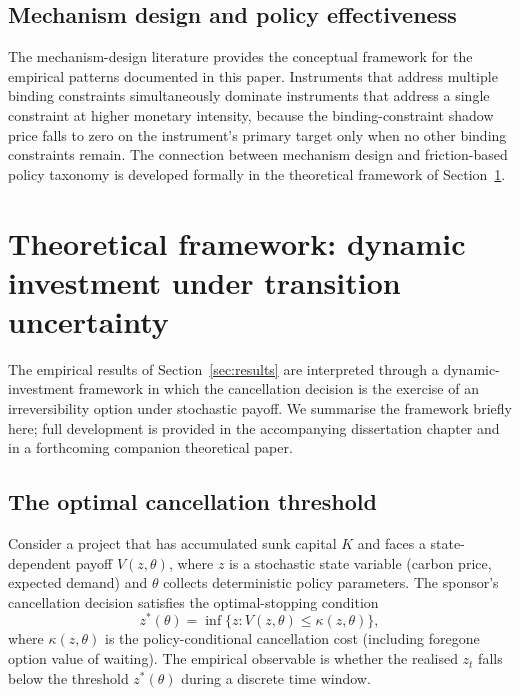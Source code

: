 \documentclass[12pt,a4paper]{article}
\theoremstyle{plain}
\theoremstyle{definition}
\begin{document}
\subsection{Mechanism design and policy effectiveness}
\label{sec:lit-mechanism}

The mechanism-design literature \cite{laffont2002theory, holmstrom1991multitask} provides the conceptual framework for the empirical patterns documented in this paper. Instruments that address multiple binding constraints simultaneously dominate instruments that address a single constraint at higher monetary intensity, because the binding-constraint shadow price falls to zero on the instrument's primary target only when no other binding constraints remain. The connection between mechanism design and friction-based policy taxonomy is developed formally in the theoretical framework of Section~\ref{sec:framework}.

\section{Theoretical framework: dynamic investment under transition uncertainty}
\label{sec:framework}

The empirical results of Section~\ref{sec:results} are interpreted through a dynamic-investment framework in which the cancellation decision is the exercise of an irreversibility option under stochastic payoff. We summarise the framework briefly here; full development is provided in the accompanying dissertation chapter and in a forthcoming companion theoretical paper.

\subsection{The optimal cancellation threshold}
\label{sec:framework-threshold}

Consider a project that has accumulated sunk capital $K$ and faces a state-dependent payoff $V(z, \theta)$, where $z$ is a stochastic state variable (carbon price, expected demand) and $\theta$ collects deterministic policy parameters. The sponsor's cancellation decision satisfies the optimal-stopping condition
\begin{equation}
z^{*}(\theta) = \inf\big\{ z : V(z, \theta) \leq \kappa(z, \theta) \big\},
\label{eq:threshold}
\end{equation}
where $\kappa(z, \theta)$ is the policy-conditional cancellation cost (including foregone option value of waiting). The empirical observable is whether the realised $z_t$ falls below the threshold $z^{*}(\theta)$ during a discrete time window.
\end{document}
